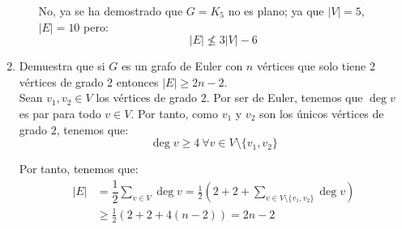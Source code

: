 \begin{ejercicio}
\begin{enumerate}
\begin{enumerate}
            No, ya se ha demostrado que $G=K_5$ no es plano; ya que $|V|=5$, $|E|=10$ pero:
            \begin{equation*}
                |E|\not\leq 3|V|-6
            \end{equation*}
        \end{enumerate}
        \item Demuestra que si $G$ es un grafo de Euler con $n$ vértices que solo tiene 2 vértices de grado 2 entonces $|E|\geq 2n - 2$.\\
        
        Sean $v_1,v_2\in V$ los vértices de grado $2$. Por ser de Euler, tenemos que $\deg v$ es par para todo $v\in V$. Por tanto, como $v_1$ y $v_2$ son los únicos vértices de grado $2$, tenemos que:
        \begin{equation*}
            \deg v\geq 4\ \forall v\in V\setminus\{v_1,v_2\}
        \end{equation*}

        Por tanto, tenemos que:
        \begin{align*}
            |E|&=\dfrac{1}{2}\sum_{v\in V}\deg v 
            = \frac{1}{2}\left(2+2+\sum_{v\in V\setminus\{v_1,v_2\}}\deg v\right)\\
            &\geq \frac{1}{2}\left(2+2+4(n-2)\right)
            = 2n-2
        \end{align*}
    \end{enumerate}
\end{ejercicio}

